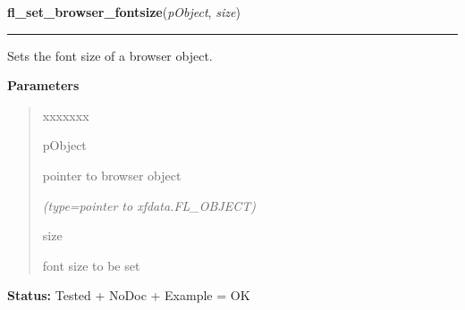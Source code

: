 \hspace{.8\funcindent}\begin{boxedminipage}{\funcwidth}

    \raggedright \textbf{fl\_set\_browser\_fontsize}(\textit{pObject}, \textit{size})

    \vspace{-1.5ex}

    \rule{\textwidth}{0.5\fboxrule}
\setlength{\parskip}{2ex}
    Sets the font size of a browser object.

\setlength{\parskip}{1ex}
      \textbf{Parameters}
      \vspace{-1ex}

      \begin{quote}
        \begin{Ventry}{xxxxxxx}

          \item[pObject]

          pointer to browser object

            {\it (type=pointer to xfdata.FL\_OBJECT)}

          \item[size]

          font size to be set

        \end{Ventry}

      \end{quote}

\textbf{Status:} Tested + NoDoc + Example = OK



    \end{boxedminipage}

    \label{xformslib:library:fl_set_browser_fontstyle}

    \vspace{0.5ex}

